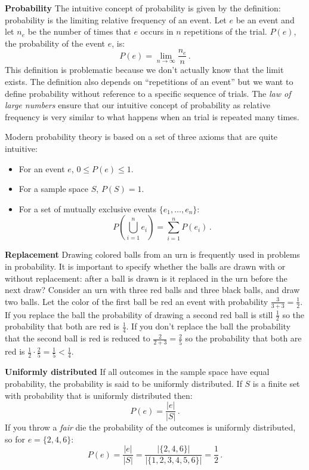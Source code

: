 \textbf{Probability} The intuitive concept of probability is given by the definition: probability is the limiting relative frequency of an event. Let $e$ be an event and let $n_e$ be the number of times that $e$ occurs in $n$ repetitions of the trial. $P(e)$, the probability of the event $e$, is:
\[
P(e) = \lim_{n\rightarrow \infty} \frac{n_e}{n}\,.
\]
This definition is problematic because we don't actually know that the limit exists. The definition also depends on ``repetitions of an event'' but we want to define probability without reference to a specific sequence of trials. The \emph{law of large numbers} ensure that our intuitive concept of probability as relative frequency is very similar to what happens when an trial is repeated many times.

Modern probability theory is based on a set of three axioms that are quite intuitive:
\begin{itemize}
\item For an event $e$, $0\leq P(e) \leq 1$.\label{p.first-axiom}
\item For a sample space $S$, $P(S) = 1$.
\item For a set of mutually exclusive events $\{e_1,\ldots,e_n\}$:
\[
P\left(\bigcup_{i=1}^{n} e_i\right)=\sum_{i=1}^{n} P(e_i)\,.
\]
\end{itemize}

\textbf{Replacement} Drawing colored balls from an urn is frequently used in problems in probability. It is important to specify whether the balls are drawn with or without replacement: after a ball is drawn is it replaced in the urn before the next draw? Consider an urn with three red balls and three black balls, and draw two balls. Let the color of the first ball be red an event with probability $\frac{3}{3+3}=\frac{1}{2}$. If you replace the ball the probability of drawing a second red ball is still $\frac{1}{2}$ so the probability that both are red is $\frac{1}{4}$. If you don't replace the ball the probability that the second ball is red is reduced to $\frac{2}{2+3}=\frac{2}{5}$ so the probability that both are red is $\frac{1}{2}\cdot\frac{2}{5}=\frac{1}{5}<\frac{1}{4}$.

\textbf{Uniformly distributed} If all outcomes in the sample space have equal probability, the probability is said to be uniformly distributed. If $S$ is a finite set with probability that is uniformly distributed then:
\[
P(e)=\frac{|e|}{|S|}\,.
\]
If you throw a \emph{fair} die the probability of the outcomes is uniformly distributed, so for $e=\{2,4,6\}$:
\[
P(e) = \frac{|e|}{|S|} = \frac{|\{2,4,6\}|}{|\{1,2,3,4,5,6\}|}=\frac{1}{2}\,.
\]


